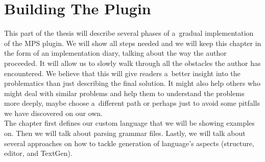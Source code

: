 \chapter{Building The Plugin}
\label{chap:importing_the_grammar}

This part of the thesis will describe several phases of a~gradual implementation of the MPS plugin.
We will show all steps needed and we will keep this chapter in the form of an implementation diary, talking about the way the author proceeded.
It will allow us to slowly walk through all the obstacles the author has encountered.
We believe that this will give readers a~better insight into the problematics than just describing the final solution.
It might also help others who might deal with similar problems and help them to understand the problems more deeply, maybe choose a~different path or perhaps just to avoid some pitfalls we have discovered on our own.
\\

The chapter first defines our custom language that we will be showing examples on.
Then we will talk about parsing grammar files.
Lastly, we will talk about several approaches on how to tackle generation of language's aspects (structure, editor, and TextGen).



\newpage



\newpage



\newpage





\newpage

